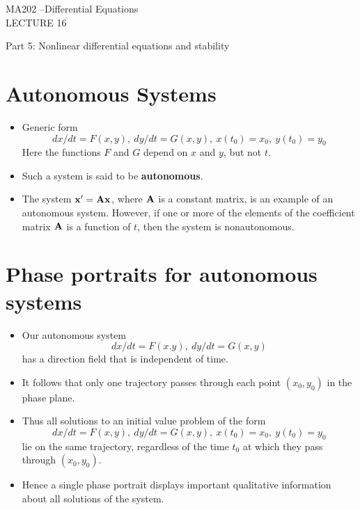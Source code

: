 \documentclass[11pt,a4paper]{article}
\begin{document}
	\begin{center}
		\vspace*{8cm}
		\Huge MA202 –Differential Equations\\
		\LARGE LECTURE 16
  \end{center}
  \newpage
	\begin{center}
		\vspace*{8cm}
		\LARGE Part 5: Nonlinear differential equations and stability
  \end{center}
  \newpage
	\section*{Autonomous Systems}
	\begin{itemize}
		\item Generic form
		$$
		dx/dt = F(x,y),\ dy/dt = G(x,y),\ x(t_0) = x_0,\ y(t_0) = y_0
		$$
		Here the functions $F$ and $G$ depend on $x$ and $y$, but not $t$.
		\item Such a system is said to be \textbf{autonomous}.
		\item The system $\vb{x}^\prime = \vb{Ax}$, where $\vb{A}$ is a constant matrix, is an example of an autonomous system. However, if one or more of the elements of the coefficient matrix $\vb{A}$ is a function of $t$, then the system is nonautonomous.
	\end{itemize}
	\section*{Phase portraits for autonomous systems}
	\begin{itemize}
		\item Our autonomous system
		$$
		dx/dt = F(x.y),\ dy/dt = G(x,y)
		$$
		has a direction field that is independent of time.
		\item It follows that only one trajectory passes through each point $(x_0, y_0)$ in the phase plane.
		\item Thus all solutions to an initial value problem of the form
		$$
		dx/dt = F(x,y),\ dy/dt = G(x,y),\ x(t_0) = x_0,\ y(t_0) = y_0
		$$
		lie on the same trajectory, regardless of the time $t_0$ at which they pass through $(x_0, y_0)$.
		\item Hence a single phase portrait displays important qualitative information about all solutions of the system.
	\end{itemize}
\end{document}

